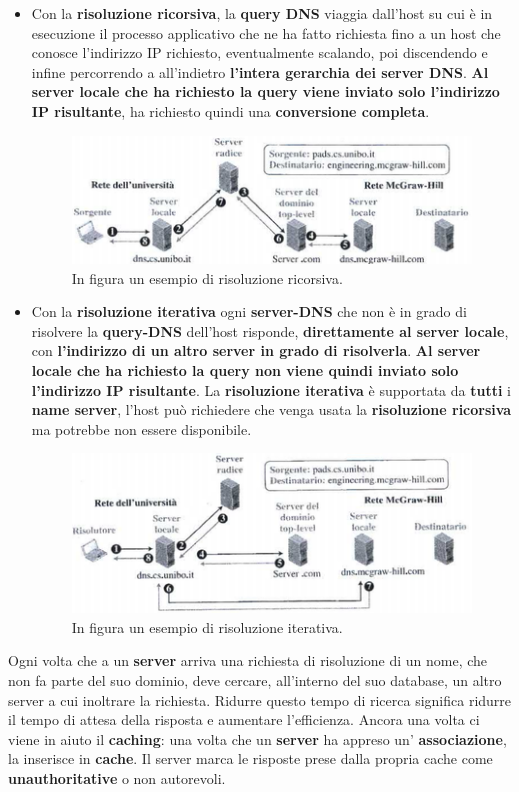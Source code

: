 \documentclass[11pt,a4paper,oneside]{book}
\theoremstyle{definition}
\begin{document}
\begin{itemize}
	\item Con la \textbf{risoluzione ricorsiva}, la \textbf{query DNS} viaggia dall'host su cui è in esecuzione il processo applicativo che ne ha fatto richiesta fino a un host che conosce l'indirizzo IP richiesto, eventualmente scalando, poi discendendo e infine percorrendo a all'indietro \textbf{l'intera gerarchia dei server DNS}. \textbf{Al server locale che ha richiesto la query viene inviato \textbf{solo} l'indirizzo IP risultante}, ha richiesto quindi una \textbf{conversione completa}.
	      \begin{figure}[!h]
		      \includegraphics[scale=0.7]{Immagini/DNSrec.png}
		      \centering
		      \caption{In figura un esempio di risoluzione ricorsiva.}
	      \end{figure}
	\item Con la  \textbf{risoluzione iterativa} ogni \textbf{server-DNS} che non è in grado di risolvere la \textbf{query-DNS} dell'host risponde, \textbf{direttamente al server locale}, con \textbf{l'indirizzo di un altro server in grado di risolverla}.
	      \textbf{	Al server locale che ha richiesto la query non viene quindi inviato solo l'indirizzo IP risultante}. La \textbf{risoluzione iterativa} è supportata da \textbf{tutti} i \textbf{name server}, l'host può richiedere che venga usata la \textbf{risoluzione ricorsiva} ma potrebbe non essere disponibile.

	      \begin{figure}[!h]
		      \includegraphics[scale=0.7]{Immagini/DNSite.png}
		      \centering
		      \caption{In figura un esempio di risoluzione iterativa.}
	      \end{figure}
\end{itemize}
Ogni volta che a un \textbf{server} arriva una richiesta di risoluzione di un nome, che non fa parte del suo dominio, deve cercare, all'interno del suo database, un altro server a cui inoltrare la richiesta. Ridurre questo tempo di ricerca significa ridurre il tempo di attesa della risposta e aumentare l'efficienza. Ancora una volta ci viene in aiuto il \textbf{caching}: una volta che un \textbf{server} ha appreso un' \textbf{associazione}, la inserisce in \textbf{cache}. Il server marca le risposte prese dalla propria cache come \textbf{unauthoritative} o non autorevoli.
\end{document}
